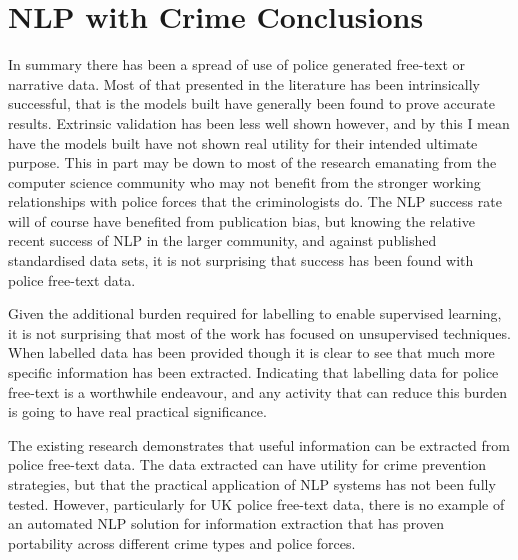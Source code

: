 \section{ NLP with Crime Conclusions} In summary there has been a spread of use of police generated free-text or narrative data. Most of that presented in the literature has been intrinsically successful, that is the models built have generally been found to prove accurate results. Extrinsic validation has been less well shown however, and by this I mean have the models built have not shown real utility for their intended ultimate purpose.  This in part may be down to most of the research emanating from the computer science community who may not benefit from the stronger working relationships with police forces that the criminologists do. The NLP success rate will of course have benefited from publication bias, but knowing the relative recent success of NLP in the larger community, and against published standardised data sets,  it is not surprising that success has been found with police free-text data. 

Given the additional burden required for labelling to enable supervised learning, it is not surprising that most of the work has focused on unsupervised techniques. When labelled data has been provided though it is clear to see that much more specific information has been extracted. Indicating that labelling data for police free-text is a worthwhile endeavour, and any activity that can reduce this burden is going to have real practical significance. 

The existing research demonstrates that useful information can be extracted from police free-text data. The data extracted can have utility for crime prevention strategies, but that the practical application of NLP systems has not been fully tested. However, particularly for UK police free-text data, there is no example of an automated NLP solution for information extraction that has proven portability across different crime types and police forces.  


